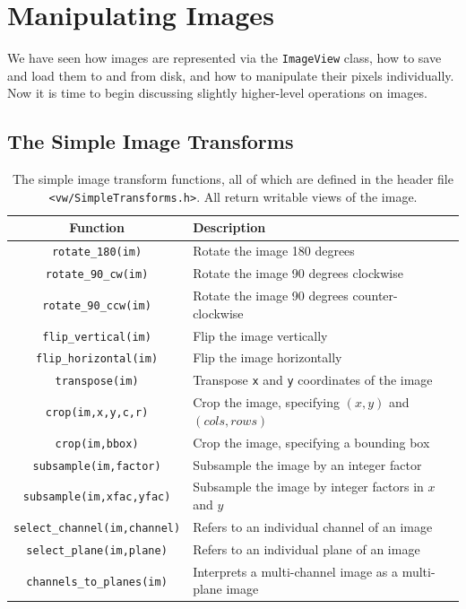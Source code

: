 \section{Manipulating Images}

We have seen how images are represented via the \verb#ImageView#
class, how to save and load them to and from disk, and how to
manipulate their pixels individually.  Now it is time to begin 
discussing slightly higher-level operations on images.

\subsection{The Simple Image Transforms}

\begin{table}[t]\begin{centering}
\begin{tabular}{|c|l|l|} \hline
Function & Description \\ \hline \hline
\verb#rotate_180(im)# & Rotate the image 180 degrees \\ \hline
\verb#rotate_90_cw(im)# & Rotate the image 90 degrees clockwise \\ \hline
\verb#rotate_90_ccw(im)# & Rotate the image 90 degrees counter-clockwise \\ \hline
\verb#flip_vertical(im)# & Flip the image vertically \\ \hline
\verb#flip_horizontal(im)# & Flip the image horizontally \\ \hline
\verb#transpose(im)# & Transpose \verb#x# and \verb#y# coordinates of the image \\ \hline
\verb#crop(im,x,y,c,r)# & Crop the image, specifying $(x,y)$ and $(cols,rows)$ \\ \hline
\verb#crop(im,bbox)# & Crop the image, specifying a bounding box \\ \hline
\verb#subsample(im,factor)# & Subsample the image by an integer factor \\ \hline
\verb#subsample(im,xfac,yfac)# & Subsample the image by integer factors in $x$ and $y$ \\ \hline
\verb#select_channel(im,channel)# & Refers to an individual channel of an image \\ \hline
\verb#select_plane(im,plane)# & Refers to an individual plane of an image \\ \hline
\verb#channels_to_planes(im)# & Interprets a multi-channel image as a multi-plane image \\ \hline
\end{tabular}
\caption{The simple image transform functions, all of which are defined in the header file 
{\tt <vw/SimpleTransforms.h>}.  All return writable views of the image.}
\label{tbl:simple-transforms}
\end{centering}\end{table}

